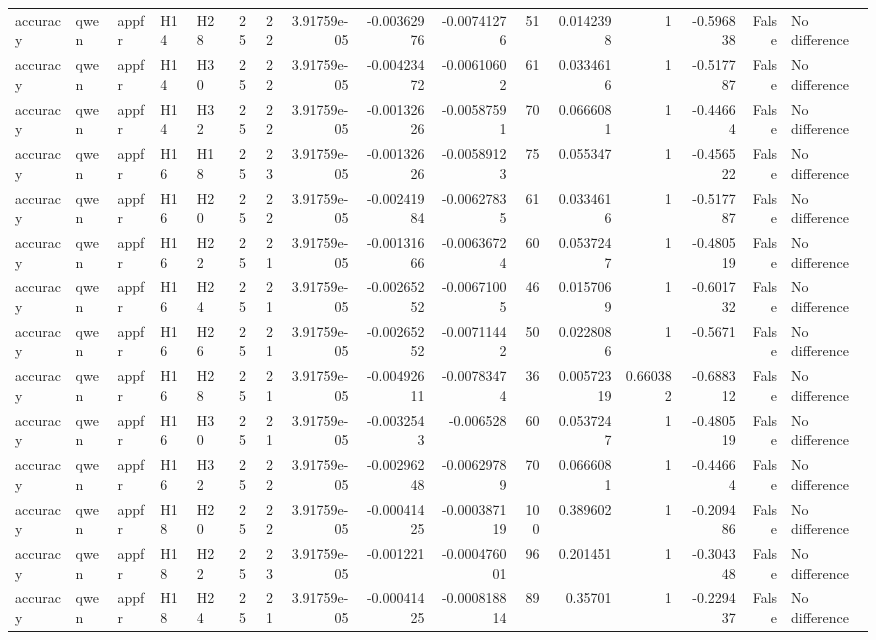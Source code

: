 \begin{longtable}{lllllrrrrrrrrrrl}
accuracy & qwen & appfr & H14 & H28 & 25 & 22 & 3.91759e-05 & -0.00362976 & -0.00741276 & 51 & 0.0142398 & 1 & -0.596838 & False & No difference \\
accuracy & qwen & appfr & H14 & H30 & 25 & 22 & 3.91759e-05 & -0.00423472 & -0.00610602 & 61 & 0.0334616 & 1 & -0.517787 & False & No difference \\
accuracy & qwen & appfr & H14 & H32 & 25 & 22 & 3.91759e-05 & -0.00132626 & -0.00587591 & 70 & 0.0666081 & 1 & -0.44664 & False & No difference \\
accuracy & qwen & appfr & H16 & H18 & 25 & 23 & 3.91759e-05 & -0.00132626 & -0.00589123 & 75 & 0.055347 & 1 & -0.456522 & False & No difference \\
accuracy & qwen & appfr & H16 & H20 & 25 & 22 & 3.91759e-05 & -0.00241984 & -0.00627835 & 61 & 0.0334616 & 1 & -0.517787 & False & No difference \\
accuracy & qwen & appfr & H16 & H22 & 25 & 21 & 3.91759e-05 & -0.00131666 & -0.00636724 & 60 & 0.0537247 & 1 & -0.480519 & False & No difference \\
accuracy & qwen & appfr & H16 & H24 & 25 & 21 & 3.91759e-05 & -0.00265252 & -0.00671005 & 46 & 0.0157069 & 1 & -0.601732 & False & No difference \\
accuracy & qwen & appfr & H16 & H26 & 25 & 21 & 3.91759e-05 & -0.00265252 & -0.00711442 & 50 & 0.0228086 & 1 & -0.5671 & False & No difference \\
accuracy & qwen & appfr & H16 & H28 & 25 & 21 & 3.91759e-05 & -0.00492611 & -0.00783474 & 36 & 0.00572319 & 0.660382 & -0.688312 & False & No difference \\
accuracy & qwen & appfr & H16 & H30 & 25 & 21 & 3.91759e-05 & -0.0032543 & -0.006528 & 60 & 0.0537247 & 1 & -0.480519 & False & No difference \\
accuracy & qwen & appfr & H16 & H32 & 25 & 22 & 3.91759e-05 & -0.00296248 & -0.00629789 & 70 & 0.0666081 & 1 & -0.44664 & False & No difference \\
accuracy & qwen & appfr & H18 & H20 & 25 & 22 & 3.91759e-05 & -0.00041425 & -0.000387119 & 100 & 0.389602 & 1 & -0.209486 & False & No difference \\
accuracy & qwen & appfr & H18 & H22 & 25 & 23 & 3.91759e-05 & -0.001221 & -0.000476001 & 96 & 0.201451 & 1 & -0.304348 & False & No difference \\
accuracy & qwen & appfr & H18 & H24 & 25 & 21 & 3.91759e-05 & -0.00041425 & -0.000818814 & 89 & 0.35701 & 1 & -0.229437 & False & No difference \\

\end{longtable}
